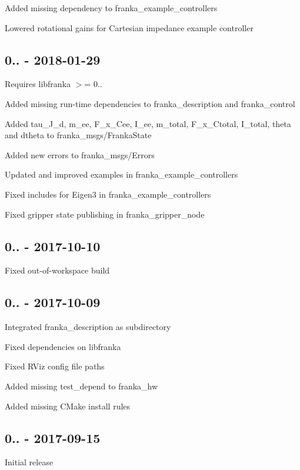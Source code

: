 \begin{DoxyItemize}
\item Added missing dependency to {\ttfamily franka\+\_\+example\+\_\+controllers}
\item Lowered rotational gains for Cartesian impedance example controller
\end{DoxyItemize}

\subsection*{0.. -\/ 2018-\/01-\/29}

Requires {\ttfamily libfranka} $>$= 0..


\begin{DoxyItemize}
\item Added missing run-\/time dependencies to {\ttfamily franka\+\_\+description} and {\ttfamily franka\+\_\+control}
\item Added {\ttfamily tau\+\_\+\+J\+\_\+d}, {\ttfamily m\+\_\+ee}, {\ttfamily F\+\_\+x\+\_\+\+Cee}, {\ttfamily I\+\_\+ee}, {\ttfamily m\+\_\+total}, {\ttfamily F\+\_\+x\+\_\+\+Ctotal}, {\ttfamily I\+\_\+total}, {\ttfamily theta} and {\ttfamily dtheta} to {\ttfamily franka\+\_\+msgs/\+Franka\+State}
\item Added new errors to {\ttfamily franka\+\_\+msgs/\+Errors}
\item Updated and improved examples in {\ttfamily franka\+\_\+example\+\_\+controllers}
\item Fixed includes for Eigen3 in {\ttfamily franka\+\_\+example\+\_\+controllers}
\item Fixed gripper state publishing in {\ttfamily franka\+\_\+gripper\+\_\+node}
\end{DoxyItemize}

\subsection*{0.. -\/ 2017-\/10-\/10}


\begin{DoxyItemize}
\item Fixed out-\/of-\/workspace build
\end{DoxyItemize}

\subsection*{0.. -\/ 2017-\/10-\/09}


\begin{DoxyItemize}
\item Integrated {\ttfamily franka\+\_\+description} as subdirectory
\item Fixed dependencies on libfranka
\item Fixed R\+Viz config file paths
\item Added missing {\ttfamily test\+\_\+depend} to {\ttfamily franka\+\_\+hw}
\item Added missing C\+Make install rules
\end{DoxyItemize}

\subsection*{0.. -\/ 2017-\/09-\/15}


\begin{DoxyItemize}
\item Initial release 
\end{DoxyItemize}